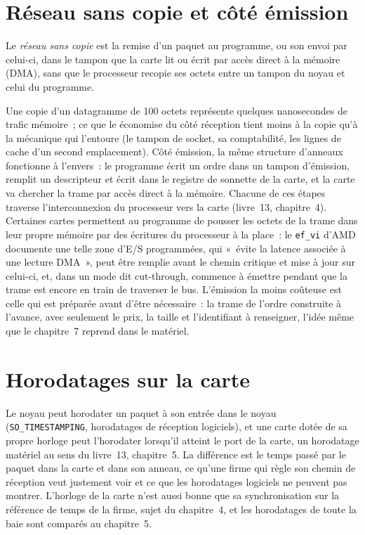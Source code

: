 \section{Réseau sans copie et côté émission}

\begin{definition}\label{def:nw:network-cards-and-kernel-bypass:zerocopy}
Le \emph{réseau sans copie} est la remise d'un paquet au programme, ou son envoi par celui-ci, dans le tampon que la carte
lit ou écrit par accès direct à la mémoire (DMA), sans que le processeur recopie ses octets entre un tampon du noyau et celui du programme.
\end{definition}

Une copie d'un datagramme de 100 octets représente quelques nanosecondes de trafic mémoire~; ce que le  économise du côté
réception tient moins à la copie qu'à la mécanique qui l'entoure (le tampon de socket, sa comptabilité, les lignes de cache d'un second
emplacement). Côté émission, la même structure d'anneaux fonctionne à l'envers~: le programme écrit un ordre dans un tampon d'émission, remplit un descripteur et écrit dans le registre de sonnette
de la carte, et la carte va chercher la trame par accès direct à la mémoire. Chacune de ces étapes traverse l'interconnexion du processeur vers
la carte (livre~13, chapitre~4). Certaines cartes permettent au programme de pousser les octets de la trame dans leur propre mémoire par des écritures
du processeur à la place~: le \texttt{ef\_vi} d'AMD documente une telle zone d'E/S programmées, qui «~évite la latence associée à une lecture DMA~»,
peut être remplie avant le chemin critique et mise à jour sur celui-ci, et, dans un mode dit cut-through, commence à émettre pendant que la trame est encore
en train de traverser le bus. L'émission la moins coûteuse est celle qui est préparée avant d'être nécessaire~: la trame de l'ordre
construite à l'avance, avec seulement le prix, la taille et l'identifiant à renseigner, l'idée même que le chapitre~7 reprend dans le matériel.

\section{Horodatages sur la carte}

Le noyau peut horodater un paquet à son entrée dans le noyau (\texttt{SO\_TIMESTAMPING}, horodatages de réception logiciels), et une carte
dotée de sa propre horloge peut l'horodater lorsqu'il atteint le port de la carte, un horodatage matériel au sens du livre~13, chapitre~5. La
différence est le temps passé par le paquet dans la carte et dans son anneau, ce qu'une firme qui règle son chemin de réception veut justement voir et
ce que les horodatages logiciels ne peuvent pas montrer. L'horloge de la carte n'est aussi bonne que sa synchronisation sur la
référence de temps de la firme, sujet du chapitre~4, et les horodatages de toute la baie sont comparés au chapitre~5.


